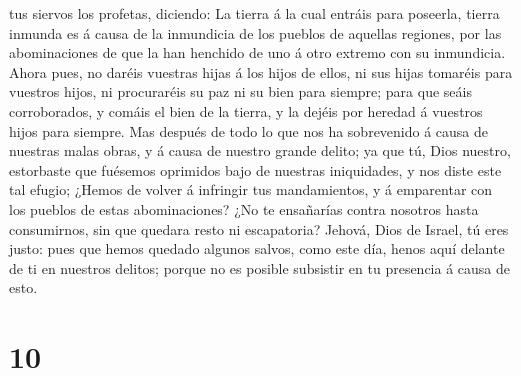 tus siervos los profetas, diciendo: La tierra á la cual entráis para
poseerla, tierra inmunda es á causa de la inmundicia de los pueblos de
aquellas regiones, por las abominaciones de que la han henchido de uno á
otro extremo con su inmundicia.  Ahora pues, no daréis
vuestras hijas á los hijos de ellos, ni sus hijas tomaréis para vuestros
hijos, ni procuraréis su paz ni su bien para siempre; para que seáis
corroborados, y comáis el bien de la tierra, y la dejéis por heredad á
vuestros hijos para siempre.  Mas después de todo lo que
nos ha sobrevenido á causa de nuestras malas obras, y á causa de nuestro
grande delito; ya que tú, Dios nuestro, estorbaste que fuésemos
oprimidos bajo de nuestras iniquidades, y nos diste este tal efugio;
 ¿Hemos de volver á infringir tus mandamientos, y á
emparentar con los pueblos de estas abominaciones? ¿No te ensañarías
contra nosotros hasta consumirnos, sin que quedara resto ni escapatoria?
 Jehová, Dios de Israel, tú eres justo: pues que hemos
quedado algunos salvos, como este día, henos aquí delante de ti en
nuestros delitos; porque no es posible subsistir en tu presencia á causa
de esto.

\hypertarget{section-9}{%
\section{10}\label{section-9}}

